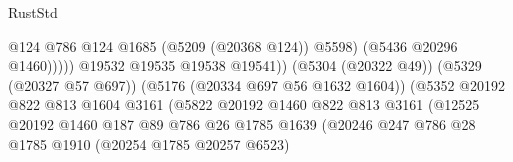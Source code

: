 \begin{lexlean}{RustStd}
\begin{coremodule}
                                                              @124
                                                              @786
                                                              @124
                                                              @1685
                                                              (@5209 (@20368 @124))
                                                              @5598)
                                                            (@5436 @20296 @1460)))))
                                                    @19532
                                                    @19535
                                                    @19538
                                                    @19541))
                                                (@5304 (@20322 @49))
                                                (@5329 (@20327 @57 @697))
                                                (@5176 (@20334 @697 @56 @1632 @1604))
                                                (@5352
                                                  @20192
                                                  @822
                                                  @813
                                                  @1604
                                                  @3161
                                                  (@5822
                                                    @20192
                                                    @1460
                                                    @822
                                                    @813
                                                    @3161
                                                    (@12525
                                                      @20192
                                                      @1460
                                                      @187
                                                      @89
                                                      @786
                                                      @26
                                                      @1785
                                                      @1639
                                                      (@20246
                                                        @247
                                                        @786
                                                        @28
                                                        @1785
                                                        @1910
                                                        (@20254 @1785 @20257 @6523)

\end{coremodule}
\end{lexlean}
